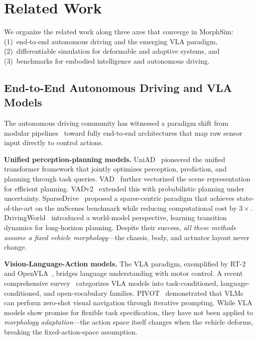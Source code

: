 
\section{Related Work}

We organize the related work along three axes that converge in MorphSim: (1)~end-to-end autonomous driving and the emerging VLA paradigm, (2)~differentiable simulation for deformable and adaptive systems, and (3)~benchmarks for embodied intelligence and autonomous driving.

\subsection{End-to-End Autonomous Driving and VLA Models}

The autonomous driving community has witnessed a paradigm shift from modular pipelines~\cite{transfusion2024,bevformer2022} toward fully end-to-end architectures that map raw sensor input directly to control actions.

\textbf{Unified perception-planning models.}
UniAD~\cite{uniad2023} pioneered the unified transformer framework that jointly optimizes perception, prediction, and planning through task queries. VAD~\cite{vad2023} further vectorized the scene representation for efficient planning. VADv2~\cite{vadv2_2024} extended this with probabilistic planning under uncertainty. SparseDrive~\cite{sparsedrive2024} proposed a sparse-centric paradigm that achieves state-of-the-art on the nuScenes benchmark while reducing computational cost by $3\times$. DrivingWorld~\cite{drivingworld2024} introduced a world-model perspective, learning transition dynamics for long-horizon planning. Despite their success, \emph{all these methods assume a fixed vehicle morphology}---the chassis, body, and actuator layout never change.

\textbf{Vision-Language-Action models.}
The VLA paradigm, exemplified by RT-2~\cite{rt2_2023} and OpenVLA~\cite{openvla2024}, bridges language understanding with motor control. A recent comprehensive survey~\cite{vla_survey2025} categorizes VLA models into task-conditioned, language-conditioned, and open-vocabulary families. PIVOT~\cite{pivot2024} demonstrated that VLMs can perform zero-shot visual navigation through iterative prompting. While VLA models show promise for flexible task specification, they have not been applied to \emph{morphology adaptation}---the action space itself changes when the vehicle deforms, breaking the fixed-action-space assumption.

